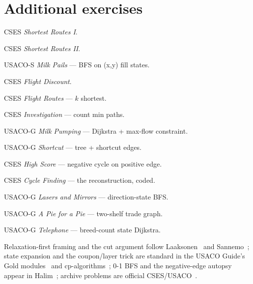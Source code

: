 \section{Additional exercises}
\begin{exercise}[easy] CSES \emph{Shortest Routes I}. \end{exercise}
\begin{exercise}[easy] CSES \emph{Shortest Routes II}. \end{exercise}
\begin{exercise}[easy] USACO-S \emph{Milk Pails} --- BFS on (x,y) fill states. \end{exercise}
\begin{exercise}[medium] CSES \emph{Flight Discount}. \end{exercise}
\begin{exercise}[medium] CSES \emph{Flight Routes} --- $k$ shortest. \end{exercise}
\begin{exercise}[medium] CSES \emph{Investigation} --- count min paths. \end{exercise}
\begin{exercise}[medium] USACO-G \emph{Milk Pumping} --- Dijkstra + max-flow constraint. \end{exercise}
\begin{exercise}[medium] USACO-G \emph{Shortcut} --- tree + shortcut edges. \end{exercise}
\begin{exercise}[hard] CSES \emph{High Score} --- negative cycle on positive edge. \end{exercise}
\begin{exercise}[hard] CSES \emph{Cycle Finding} --- the reconstruction, coded. \end{exercise}
\begin{exercise}[hard] USACO-G \emph{Lasers and Mirrors} --- direction-state BFS. \end{exercise}
\begin{exercise}[hard] USACO-G \emph{A Pie for a Pie} --- two-shelf trade graph. \end{exercise}
\begin{exercise}[hard] USACO-G \emph{Telephone} --- breed-count state Dijkstra. \end{exercise}

\chapternotes
Relaxation-first framing and the cut argument follow
Laaksonen~\cite{laaksonen2024} and Sannemo~\cite{sannemo2025};
state expansion and the coupon/layer trick are standard in the USACO
Guide's Gold modules~\cite{usacoguide} and
cp-algorithms~\cite{cpalgorithms}; 0-1 BFS and the negative-edge
autopsy appear in Halim~\cite{halimcp4}; archive problems are
official CSES/USACO~\cite{cses}.

